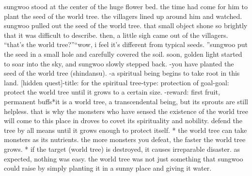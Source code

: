 sungwoo stood at the center of the huge flower bed.
the time had come for him to plant the seed of the world tree.
 the villagers lined up around him and watched.
sungwoo pulled out the seed of the world tree.
 that small object shone so brightly that it was difficult to describe.
 then, a little sigh came out of the villagers.
“that’s the world tree?”“wow, i feel it’s different from typical seeds.
”sungwoo put the seed in a small hole and carefully covered the soil.
soon, golden light started to soar into the sky, and sungwoo slowly stepped back.
-you have planted the seed of the world tree (shindansu).
-a spiritual being begins to take root in this land.
[hidden quest]-title: for the spiritual tree-type: protection of goal-goal: protect the world tree until it grows to a certain size.
-reward: first fruit, permanent buffs*it is a world tree, a transcendental being, but its sprouts are still helpless.
 that is why the monsters who have sensed the existence of the world tree will come to this place in droves to covet its spirituality and nobility.
 defend the tree by all means until it grows enough to protect itself.
* the world tree can take monsters as its nutrients.
 the more monsters you defeat, the faster the world tree grows.
* if the target (world tree) is destroyed, it causes irreparable disaster.
as expected, nothing was easy.
 the world tree was not just something that sungwoo could raise by simply planting it in a sunny place and giving it water.

